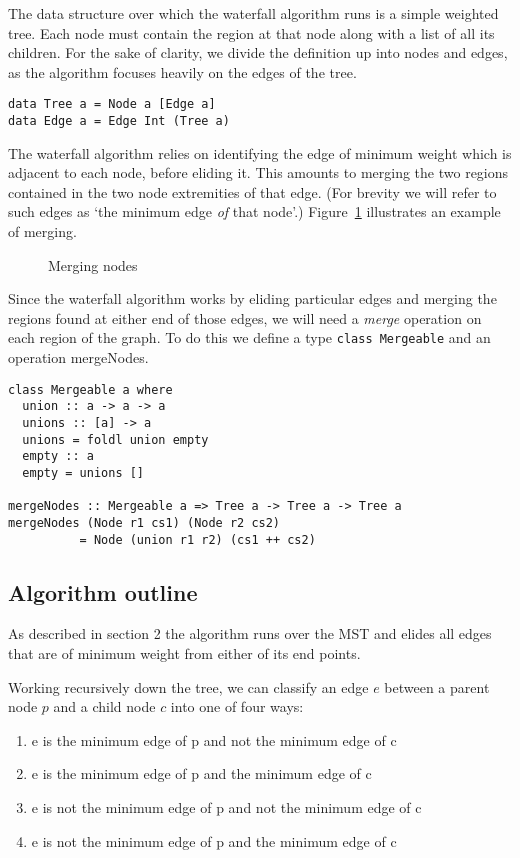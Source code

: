 \documentclass{jfp}
\begin{document}
The data structure over which the waterfall algorithm runs is a simple
weighted tree. Each node must contain the region at that node along
with a list of all its children.  For the sake of clarity, we divide
the definition up into nodes and edges, as the algorithm focuses
heavily on the edges of the tree.

\begin{verbatim}
data Tree a = Node a [Edge a]
data Edge a = Edge Int (Tree a)
\end{verbatim}


The waterfall algorithm relies on identifying the edge of minimum
weight which is adjacent to each node, before eliding it. This amounts
to merging the two regions contained in the two node extremities of
that edge.  (For brevity we will refer to such edges as `the minimum
edge {\em of\/} that node'.) Figure~\ref{fig:merging} illustrates an
example of merging.

\begin{figure}
\centering
\ifpdf
\else
\fi
\caption{Merging nodes}
\label{fig:merging}
\end{figure}

Since the waterfall algorithm works by eliding particular edges and
merging the regions found at either end of those edges, we will need a
{\em merge} operation on each region of the graph. To do this we
define a type {\tt class Mergeable} and an operation mergeNodes.

\begin{verbatim}
class Mergeable a where
  union :: a -> a -> a
  unions :: [a] -> a
  unions = foldl union empty
  empty :: a
  empty = unions []

mergeNodes :: Mergeable a => Tree a -> Tree a -> Tree a
mergeNodes (Node r1 cs1) (Node r2 cs2)
          = Node (union r1 r2) (cs1 ++ cs2)
\end{verbatim}


\subsection{Algorithm outline}

As described in section 2 %
the algorithm runs over the MST and
elides all edges that are of minimum weight from either of its end
points.

Working recursively down the tree, we can classify an edge $e$ between
a parent node $p$ and a child node $c$ into one of four ways:
\begin{enumerate}[I]
\item e is     the minimum edge of p and not the minimum edge of c
\item e is     the minimum edge of p and     the minimum edge of c
\item e is not the minimum edge of p and not the minimum edge of c
\item e is not the minimum edge of p and     the minimum edge of c
\end{enumerate}
\end{document}
